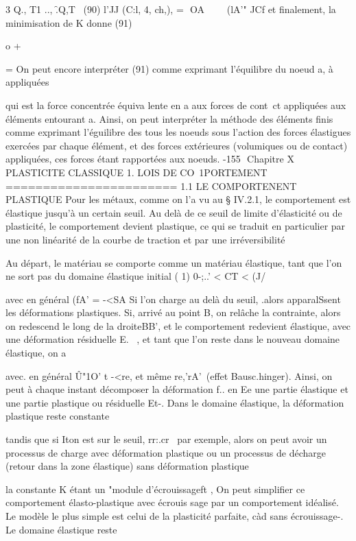 {{{{{{{{{{{{{{3 Q., T1 
.., \f.Q,T~
(90) l'JJ (C:l, 4, ch,), = ­
OA 
~ 
 ~
(lA'" JCf 
et finalement, la minimisation de K donne 
(91) 

o
+ 

= 
On peut encore interpréter (91) comme exprimant l'équilibre du noeud a, à appliquées

qui est la force concentrée équiva­
lente en a aux forces de cont~ct appliquées aux éléments entourant a. 
Ainsi, on peut interpréter la méthode des éléments finis comme exprimant l'éguilibre des tous les noeuds sous l'action des forces élas­tigues exercées par chaque élément, et des forces extérieures (volumiques ou de contact) appliquées, ces forces étant rapportées aux noeuds. 
-155 ­
Chapitre X 
PLASTICITE CLASSIQUE 
1. LOIS DE CO~1PORTEMENT 
======================= 
1.1 LE COMPORTENENT PLASTIQUE 
Pour les métaux, comme on l'a vu au § IV.2.1, le comportement est élastique jusqu'à un certain seuil. Au delà de ce seuil de limite d'élasti­cité ou de plasticité, le comportement devient plastique, ce qui se traduit en particulier par une non linéarité de la courbe de traction et par une irréversibilité 


Au départ, le matériau se comporte comme un matériau élastique, tant que l'on ne sort pas du domaine élastique initial 
( 1) 
0-;..' < CT < (J/\ 

avec en général (fA' = -<SA Si l'on charge au delà du seuil, .alors apparalS­sent les déformations plastiques. Si, arrivé au point B, on relâche la con­trainte, alors on redescend le long de la droiteBB', et le comportement re­devient élastique, avec une déformation résiduelle E.~ , et tant que l'on reste dans le nouveau domaine élastique, on a 

avec. en général Û"1O' t -<re, et même \<re,'\<\<rA'\ (effet Bausc.hinger). 
Ainsi, on peut à chaque instant décomposer la déformation f.. en Ee
une partie élastique et une partie plastique ou résiduelle Et-. Dans le domaine élastique, la déformation plastique reste constante 

tandis que si Iton est sur le seuil, rr:.cr~ par exemple, alors on peut avoir un processus de charge avec déformation plastique ou un processus de décharge (retour dans la zone élastique) sans déformation plastique 

la constante K étant un "module d'écrouissageft , 
On peut simplifier ce comportement élasto-plastique avec écrouis­
sage par un 	comportement idéalisé. Le modèle le plus simple est celui de 
la plasticité parfaite, càd sans écrouissage-. Le domaine élastique reste 

}}}}}}}}}}}}}}
